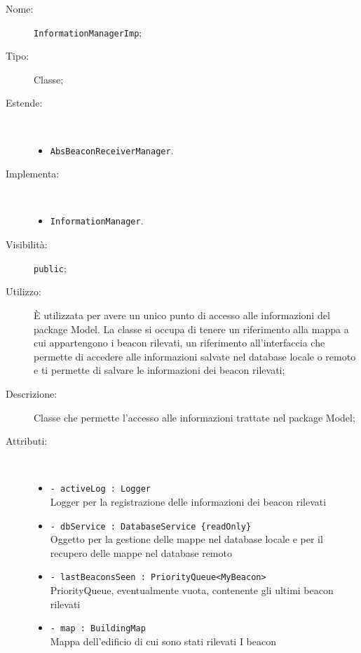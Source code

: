 \documentclass[../DefinizioneDiProdotto.tex]{subfiles}
\begin{document}
    \begin{description}
\item[Nome:] \texttt{InformationManagerImp};
\item[Tipo:] Classe;
\item[Estende:] \
\begin{itemize}
\item \texttt{AbsBeaconReceiverManager}.
\end{itemize}
\item[Implementa:] \
\begin{itemize}
\item \texttt{InformationManager}.

\end{itemize}
\item[Visibilità:] \texttt{public};
\item[Utilizzo:] È utilizzata per avere un unico punto di accesso alle informazioni del package Model. La classe si occupa di tenere un riferimento alla mappa a cui appartengono i beacon rilevati, un riferimento all'interfaccia che permette di accedere alle informazioni salvate nel database locale o remoto e ti permette di salvare le informazioni dei beacon rilevati;
\item[Descrizione:] Classe che permette l'accesso alle informazioni trattate nel package Model;
\item[Attributi:] \
\begin{itemize}
\item \texttt{- activeLog : Logger}\\
Logger per la registrazione delle informazioni dei beacon rilevati

\item \texttt{- dbService : DatabaseService \{readOnly\}}\\
Oggetto per la gestione delle mappe nel database locale e per il recupero delle mappe nel database remoto

\item \texttt{- lastBeaconsSeen : PriorityQueue<MyBeacon>}\\
PriorityQueue, eventualmente vuota, contenente gli ultimi beacon rilevati

\item \texttt{- map : BuildingMap}\\
Mappa dell'edificio di cui sono stati rilevati I beacon


\end{itemize}
\end{description}
\end{document}
